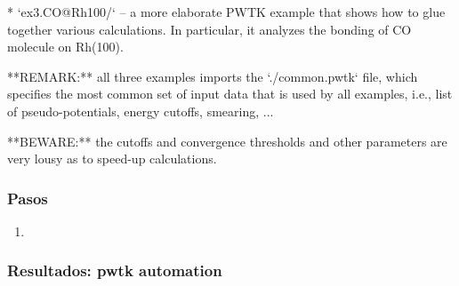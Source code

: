* `ex3.CO@Rh100/` -- a more elaborate PWTK example that shows how to
                     glue together various calculations. In particular,
                     it analyzes the bonding of CO molecule on Rh(100).


**REMARK:** all three examples imports the `./common.pwtk` file, which
specifies the most common set of input data that is used by all
examples, i.e., list of pseudo-potentials, energy cutoffs,
smearing, ...


**BEWARE:** the cutoffs and convergence thresholds and other parameters are
very lousy as to speed-up calculations.


\subsubsection{Pasos}

  \begin{enumerate}
    \item
      \begin{verbatim}

      \end{verbatim}
  \end{enumerate}

\subsubsection{Resultados: pwtk automation}
